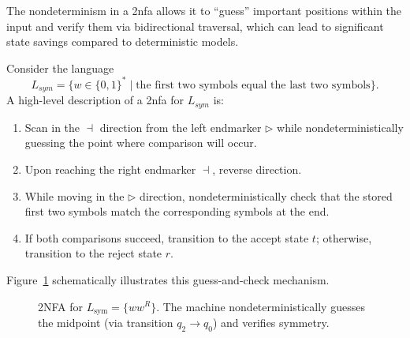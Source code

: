 \begin{remark}
The nondeterminism in a \gls{2nfa} allows it to “guess” important positions within the input and verify them via bidirectional traversal, which can lead to significant state savings compared to deterministic models.
\end{remark}

\begin{example}
Consider the language 
\[
L_{sym} = \{ w \in \{0,1\}^* \mid \text{the first two symbols equal the last two symbols} \}.
\]
A high-level description of a \gls{2nfa} for \(L_{sym}\) is:
\begin{enumerate}
    \item Scan in the \(\dashv\) direction from the left endmarker \(\triangleright\) while nondeterministically guessing the point where comparison will occur.
    \item Upon reaching the right endmarker \(\dashv\), reverse direction.
    \item While moving in the \(\triangleright\) direction, nondeterministically check that the stored first two symbols match the corresponding symbols at the end.
    \item If both comparisons succeed, transition to the accept state \(t\); otherwise, transition to the reject state \(r\).
\end{enumerate}
Figure~\ref{fig:2nfa-example} schematically illustrates this guess-and-check mechanism.
\end{example}

\begin{figure}[ht]
    \centering  
    \caption{2NFA for \(L_{\text{sym}} = \{ww^R\}\). The machine nondeterministically guesses the midpoint (via transition \(q_2 \to q_0\)) and verifies symmetry.}
    \label{fig:2nfa-example}
\end{figure}

